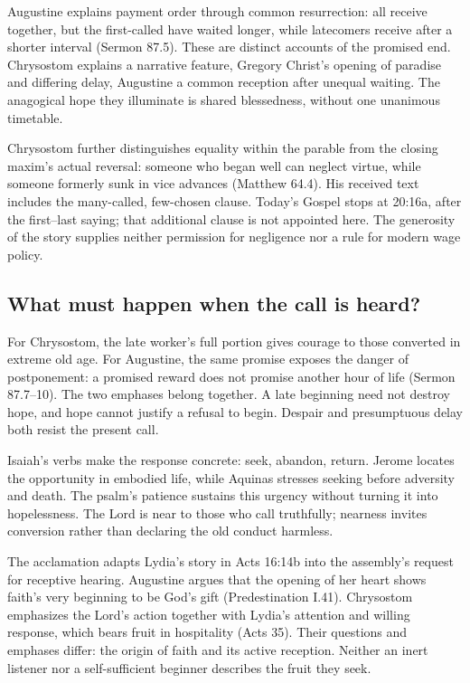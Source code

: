 Augustine explains payment order through common resurrection: all receive together, but the first-called have waited longer, while latecomers receive after a shorter interval (Sermon 87.5). These are distinct accounts of the promised end. Chrysostom explains a narrative feature, Gregory Christ's opening of paradise and differing delay, Augustine a common reception after unequal waiting. The anagogical hope they illuminate is shared blessedness, without one unanimous timetable.

Chrysostom further distinguishes equality within the parable from the closing maxim's actual reversal: someone who began well can neglect virtue, while someone formerly sunk in vice advances (Matthew 64.4). His received text includes the many-called, few-chosen clause. Today's Gospel stops at 20:16a, after the first--last saying; that additional clause is not appointed here. The generosity of the story supplies neither permission for negligence nor a rule for modern wage policy.

\subsection{What must happen when the call is heard?}
For Chrysostom, the late worker's full portion gives courage to those converted in extreme old age. For Augustine, the same promise exposes the danger of postponement: a promised reward does not promise another hour of life (Sermon 87.7--10). The two emphases belong together. A late beginning need not destroy hope, and hope cannot justify a refusal to begin. Despair and presumptuous delay both resist the present call.

Isaiah's verbs make the response concrete: seek, abandon, return. Jerome locates the opportunity in embodied life, while Aquinas stresses seeking before adversity and death. The psalm's patience sustains this urgency without turning it into hopelessness. The Lord is near to those who call truthfully; nearness invites conversion rather than declaring the old conduct harmless.

The acclamation adapts Lydia's story in Acts 16:14b into the assembly's request for receptive hearing. Augustine argues that the opening of her heart shows faith's very beginning to be God's gift (Predestination I.41). Chrysostom emphasizes the Lord's action together with Lydia's attention and willing response, which bears fruit in hospitality (Acts 35). Their questions and emphases differ: the origin of faith and its active reception. Neither an inert listener nor a self-sufficient beginner describes the fruit they seek.

